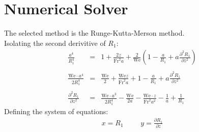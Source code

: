 \documentclass[11pt, a4paper]{article}
\begin{document}
\section{Numerical Solver}
The selected method is the Runge-Kutta-Merson method. \\
Isolating the second derivitive of $R_1$:
\begin{equation}
    \begin{array}{rcl}
        \displaystyle\frac{a^4}{R_1^4}&=&\displaystyle1+\frac{2z}{\text{Fr}^2a}+\frac{2}{\text{We}}\left(1-\frac{a}{R_1}+a\frac{\partial^2 R_1}{\partial z^2}\right) \\\\
        \displaystyle\frac{\text{We}\cdot a^4}{2R_1^4}&=&\displaystyle\frac{\text{We}}{2}+\frac{\text{We}z}{\text{Fr}^2a}+1-\frac{a}{R_1}+a\frac{\partial^2R_1}{\partial z^2} \\\\
        \displaystyle\frac{\partial^2R_1}{\partial z^2}&=&\displaystyle\frac{\text{We}\cdot a^3}{2R_1^4}-\frac{\text{We}}{2a}-\frac{\text{We}\cdot z}{\text{Fr}^2a^2}-\frac{1}{a}+\frac{1}{R_1}
    \end{array}
\end{equation}
Defining the system of equations:
\begin{equation}
    \begin{matrix}
        x=R_1 &&& y=\displaystyle\frac{\partial R_1}{\partial z}
    \end{matrix}
\end{equation}
\end{document}
